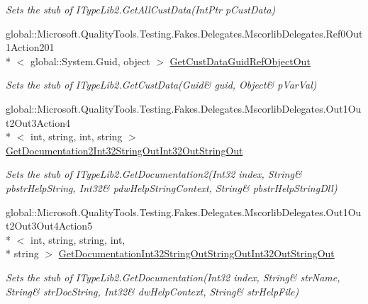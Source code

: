 \begin{DoxyCompactItemize}
\begin{DoxyCompactList}\small\item\em Sets the stub of I\-Type\-Lib2.\-Get\-All\-Cust\-Data(\-Int\-Ptr p\-Cust\-Data)\end{DoxyCompactList}\item 
global\-::\-Microsoft.\-Quality\-Tools.\-Testing.\-Fakes.\-Delegates.\-Mscorlib\-Delegates.\-Ref0\-Out1\-Action201\\*
$<$ global\-::\-System.\-Guid, object $>$ \hyperlink{class_system_1_1_runtime_1_1_interop_services_1_1_com_types_1_1_fakes_1_1_stub_i_type_lib2_a33a84f4d6a10f3025ff9ec92c22d6b82}{Get\-Cust\-Data\-Guid\-Ref\-Object\-Out}
\begin{DoxyCompactList}\small\item\em Sets the stub of I\-Type\-Lib2.\-Get\-Cust\-Data(Guid\& guid, Object\& p\-Var\-Val)\end{DoxyCompactList}\item 
global\-::\-Microsoft.\-Quality\-Tools.\-Testing.\-Fakes.\-Delegates.\-Mscorlib\-Delegates.\-Out1\-Out2\-Out3\-Action4\\*
$<$ int, string, int, string $>$ \hyperlink{class_system_1_1_runtime_1_1_interop_services_1_1_com_types_1_1_fakes_1_1_stub_i_type_lib2_a7d2f469b075e994077db9c50431facb7}{Get\-Documentation2\-Int32\-String\-Out\-Int32\-Out\-String\-Out}
\begin{DoxyCompactList}\small\item\em Sets the stub of I\-Type\-Lib2.\-Get\-Documentation2(Int32 index, String\& pbstr\-Help\-String, Int32\& pdw\-Help\-String\-Context, String\& pbstr\-Help\-String\-Dll)\end{DoxyCompactList}\item 
global\-::\-Microsoft.\-Quality\-Tools.\-Testing.\-Fakes.\-Delegates.\-Mscorlib\-Delegates.\-Out1\-Out2\-Out3\-Out4\-Action5\\*
$<$ int, string, string, int, \\*
string $>$ \hyperlink{class_system_1_1_runtime_1_1_interop_services_1_1_com_types_1_1_fakes_1_1_stub_i_type_lib2_adbdf83c261ca463784a7db29d7c7ac32}{Get\-Documentation\-Int32\-String\-Out\-String\-Out\-Int32\-Out\-String\-Out}
\begin{DoxyCompactList}\small\item\em Sets the stub of I\-Type\-Lib2.\-Get\-Documentation(Int32 index, String\& str\-Name, String\& str\-Doc\-String, Int32\& dw\-Help\-Context, String\& str\-Help\-File)\end{DoxyCompactList}\item 

\end{DoxyCompactItemize}
